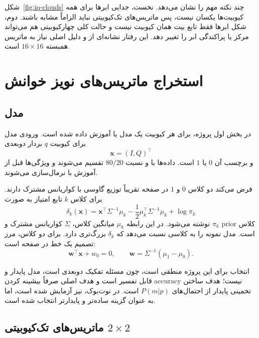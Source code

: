 شکل~\ref{fig:iq-clouds} چند نکته مهم را نشان می‌دهد. نخست، جدایی ابرها برای همه کیوبیت‌ها یکسان نیست، پس ماتریس‌های تک‌کیوبیتی نباید الزاماً مشابه باشند. دوم، شکل ابرها فقط تابع بیت همان کیوبیت نیست و حالت کلی چهارکیوبیتی هم می‌تواند مرکز یا پراکندگی ابر را تغییر دهد. این رفتار نشانه‌ای از  و دلیل اصلی نیاز به ماتریس همبسته $16\times16$ است.

\section{استخراج ماتریس‌های نویز خوانش}

\subsection{مدل }

در بخش اول پروژه، برای هر کیوبیت یک مدل  یا  آموزش داده شده است. ورودی مدل برای کیوبیت $q$ بردار دوبعدی
\[
	\mathbf{x}=(I,Q)^\top
\]
و برچسب آن $0$ یا $1$ است. داده‌ها با  و نسبت $80/20$ تقسیم می‌شوند و ویژگی‌ها قبل از آموزش با  نرمال‌سازی می‌شوند.

 فرض می‌کند دو کلاس $0$ و $1$ در صفحه  تقریباً توزیع گاوسی با کواریانس مشترک دارند. برای کلاس $k$ تابع امتیاز به صورت
\begin{equation}
	\delta_k(\mathbf{x}) =
	\mathbf{x}^{\top}\Sigma^{-1}\mu_k
	-\frac{1}{2}\mu_k^{\top}\Sigma^{-1}\mu_k
	+\log \pi_k
	\label{eq:lda-score}
\end{equation}
نوشته می‌شود. در این رابطه $\mu_k$ میانگین کلاس، $\Sigma$ کواریانس مشترک و $\pi_k$ prior کلاس است. مدل نمونه را به کلاسی نسبت می‌دهد که $\delta_k$ بزرگ‌تری دارد. برای دو کلاس، مرز تصمیم یک خط در صفحه  است:
\[
	\mathbf{w}^{\top}\mathbf{x}+w_0=0,\qquad
	\mathbf{w}=\Sigma^{-1}(\mu_1-\mu_0).
\]

انتخاب  برای این پروژه منطقی است، چون مسئله تفکیک  دوبعدی است، مدل پایدار و قابل تفسیر است و هدف اصلی صرفاً بیشینه کردن accuracy نیست؛ هدف ساختن تخمینی پایدار از احتمال‌های $P(m|p)$ است. در نوت‌بوک،  نیز آزمایش شده است، اما  به عنوان گزینه ساده‌تر و پایدارتر انتخاب شده است.

\subsection{ماتریس‌های تک‌کیوبیتی $2\times2$}

